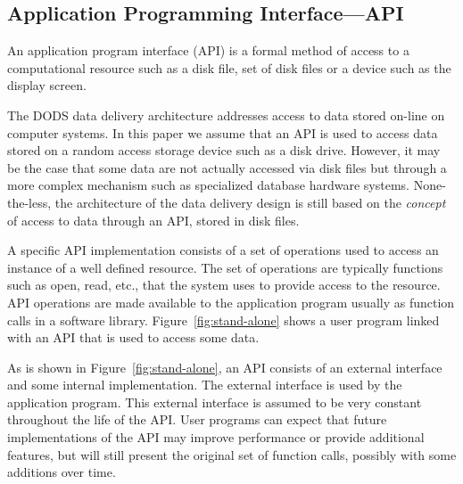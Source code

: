 \subsection{Application Programming Interface---API}

An application program interface (API) is a formal method of access to a
computational resource such as a disk file, set of disk files or a device
such as the display screen.

%

The DODS data delivery architecture addresses access to data stored on-line
on computer systems. In this paper we assume that an API is used to access
data stored on a random access storage device such as a disk drive.  However,
it may be the case that some data are not actually accessed via disk files
but through a more complex mechanism such as specialized database hardware
systems. None-the-less, the architecture of the data delivery design is still
based on the {\em concept\/} of access to data through an API, stored in disk
files.

A specific API implementation consists of a set of operations used to access
an instance of a well defined resource.  The set of operations are typically
functions such as open, read, etc., that the system uses to provide access to
the resource.  API operations are made available to the application program
usually as function calls in a software library. Figure~\ref{fig:stand-alone}
shows a user program linked with an API that is used to access some data.

As is shown in Figure~\ref{fig:stand-alone}, an API consists of an external
interface and some internal implementation. The external interface is used by
the application program. This external interface is assumed to be very
constant throughout the life of the API\@. User programs can expect that future
implementations of the API may improve performance or provide additional
features, but will still present the original set of function calls, possibly
with some additions over time.


